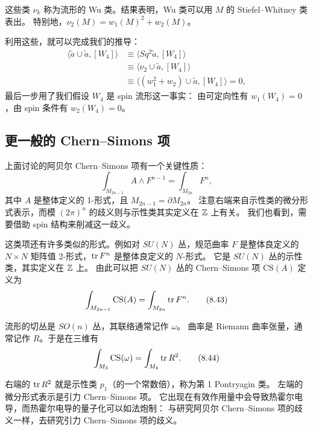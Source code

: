 这些类 $\nu_k$ 称为流形的 Wu 类。结果表明，Wu 类可以用 $M$ 的 Stiefel--Whitney 类表出。
特别地，$\nu_2(M)=w_1(M)^2+w_2(M)$。

利用这些，就可以完成我们的推导：
\begin{align}
\langle\tilde a\cup\tilde a,[W_4]\rangle&\equiv\langle Sq^2\tilde a,[W_4]\rangle \tag{8.39}\\
&\equiv\langle\nu_2\cup\tilde a,[W_4]\rangle \tag{8.40}\\
&\equiv\langle(w_1^2+w_2)\cup\tilde a,[W_4]\rangle=0, \tag{8.41}
\end{align}
最后一步用了我们假设 $W_4$ 是 spin 流形这一事实：
由可定向性有 $w_1(W_4)=0$，由 spin 条件有 $w_2(W_4)=0$。

\subsection{更一般的 Chern--Simons 项}

上面讨论的阿贝尔 Chern--Simons 项有一个关键性质：
\begin{equation}
\int_{M_{2n-1}}A\wedge F^{n-1}=\int_{M_{2n}}F^n,
\tag{8.42}
\end{equation}
其中 $A$ 是整体定义的 1-形式，且 $M_{2n-1}=\partial M_{2n}$。
注意右端来自示性类的微分形式表示，而模 $(2\pi)^n$ 的歧义则与示性类其实定义在 $\mathbb{Z}$ 上有关。
我们也看到，需要借助 spin 结构来削减这一歧义。

这类项还有许多类似的形式。例如对 $SU(N)$ 丛，规范曲率 $F$ 是整体良定义的
$N\times N$ 矩阵值 2-形式，$\operatorname{tr} F^n$ 是整体良定义的 $N$-形式。
它是 $SU(N)$ 丛的示性类，其实定义在 $\mathbb{Z}$ 上。
由此可以把 $SU(N)$ 丛的 Chern--Simons 项 $\mathrm{CS}(A)$ 定义为
\begin{equation}
\int_{M_{2n-1}}\mathrm{CS}(A)=\int_{M_{2n}}\operatorname{tr} F^n.
\tag{8.43}
\end{equation}

流形的切丛是 $SO(n)$ 丛，其联络通常记作 $\omega$。
曲率是 Riemann 曲率张量，通常记作 $R$。于是在三维有
\begin{equation}
\int_{M_3}\mathrm{CS}(\omega)=\int_{M_4}\operatorname{tr} R^2.
\tag{8.44}
\end{equation}

右端的 $\operatorname{tr} R^2$ 就是示性类 $p_1$（的一个常数倍），称为第 1 Pontryagin 类。
左端的微分形式表示是引力 Chern--Simons 项。
它出现在有效作用量中会导致热霍尔电导，而热霍尔电导的量子化可以如法炮制：
与研究阿贝尔 Chern--Simons 项的歧义一样，去研究引力 Chern--Simons 项的歧义。

